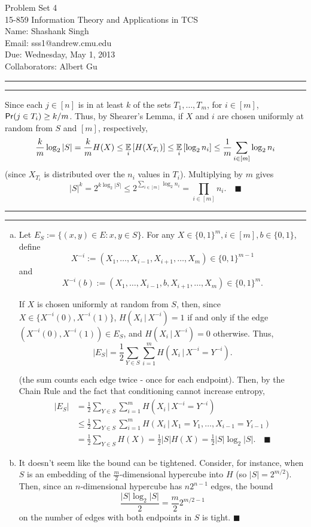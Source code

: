 \documentclass[11pt]{article}
\makeatletter
\newcounter{questionCounter}
\newcounter{partCounter}[questionCounter]
\newenvironment{question}[2][\arabic{questionCounter}]{%
    \setcounter{partCounter}{0}%
    \vspace{.25in} \hrule \vspace{0.5em}%
        \noindent{\bf #2}%
    \vspace{0.8em} \hrule \vspace{.10in}%
    \addtocounter{questionCounter}{1}%
}{}
\newcommand{\name}{Shashank Singh}
\newcommand{\andrew}{sss1@andrew.cmu.edu}
\newcommand{\class}{15-859 Information Theory and Applications in TCS}
\newcommand{\hwnum}{4}
\newcommand{\duedate}{Wednesday, May 1, 2013}
\newcommand{\collaborators}{Albert Gu}
\renewcommand{\qed}{\quad $\blacksquare$}
\newcommand{\mqed}{\quad \blacksquare}
\newcommand{\pr}{\operatornamewithlimits{\mathsf{Pr}}} %
\newcommand{\E}{\operatornamewithlimits{\mathbb{E}}} %
\newcommand{\giv}{\, | \,} %
\makeatother
\begin{document}
\thispagestyle{plain}

{\Large Problem Set \hwnum} \\
\class \\
Name: \name \\
Email: \andrew \\
Due: \duedate \\
Collaborators: \collaborators

\begin{question}{Problem 1}
Since each $j \in [n]$ is in at least $k$ of the sets $T_1,\dots,T_m$, for
$i \in [m]$, $\pr(j \in T_i) \geq k/m$. Thus, by Shearer's Lemma, if $X$ and
$i$ are chosen uniformly at random from $S$ and $[m]$, respectively,
\[\frac{k}{m} \log_2 |S|
    = \frac{k}{m} H(X)
    \leq \E_i \left[ H(X_{T_i}) \right]
    \leq \E_i \left[ \log_2 n_i \right]
    \leq \frac{1}{m} \sum_{i \in [m]} \log_2 n_i
\]
(since $X_{T_i}$ is distributed over the $n_i$ values in $T_i$). Multiplying by
$m$ gives
\[|S|^k
    = 2^{k \log_2 |S|}
    \leq 2^{\sum_{i \in [m]} \log_2 n_i}
    = \prod_{i \in [m]} n_i. \mqed
\]
\end{question}

\begin{question}{Problem 2}
\begin{enumerate}[(a)]
\item Let $E_S := \{(x,y) \in E : x,y \in S\}$. For any
$X \in \{0,1\}^m, i \in [m], b \in \{0,1\}$, define
\[X^{-i} := (X_1,\dots,X_{i - 1},X_{i + 1},\dots,X_m) \in \{0,1\}^{m - 1}\] and
\[X^{-i}(b) := (X_1,\dots,X_{i - 1},b,X_{i + 1},\dots,X_m) \in \{0,1\}^m.\]

If $X$ is chosen uniformly at random from $S$, then, since
$X \in \{X^{-i}(0),X^{-i}(1)\}$, $H(X_i \giv X^{-i}) = 1$ if and only if
the edge $(X^{-i}(0),X^{-i}(1)) \in E_S$, and $H(X_i \giv X^{-i}) = 0$
otherwise. Thus,
\[|E_S| = \frac12 \sum_{Y \in S} \sum_{i = 1}^m H(X_i \giv X^{-i} = Y^{-i}).\]

(the sum counts each edge twice - once for each endpoint). Then, by the Chain
Rule and the fact that conditioning cannot increase entropy,
\begin{align*}
|E_S|
 & =    \frac12 \sum_{Y \in S} \sum_{i = 1}^m H(X_i \giv X^{-i} = Y^{-i})   \\
 & \leq \frac12 \sum_{Y \in S} \sum_{i = 1}^m
                    H(X_i \giv X_1 = Y_1,\dots,X_{i - 1} = Y_{i - 1})       \\
 & =    \frac12 \sum_{Y \in S} H(X)
   =    \frac12 |S|H(X)
   =    \frac12 |S|\log_2|S|. \mqed
\end{align*}

\item It doesn't seem like the bound can be tightened. Consider, for instance,
when $S$ is an embedding of the $\frac{m}{2}$-dimensional hypercube into $H$
(so $|S| = 2^{m/2}$). Then, since an $n$-dimensional hypercube has
$n2^{n - 1}$ edges, the bound
\[\frac{|S|\log_2|S|}{2} = \frac{m}{2}2^{m/2 - 1}\]
on the number of edges with both endpoints in $S$ is tight. \qed
\end{enumerate}
\end{question}
\end{document}
